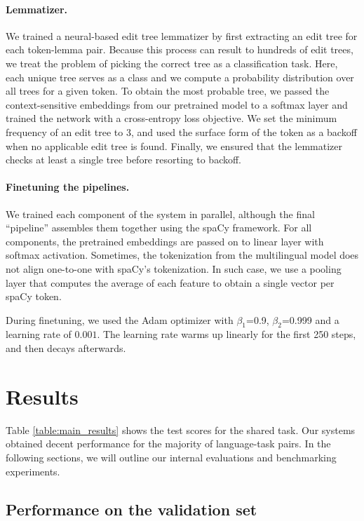 \documentclass[11pt]{article}
\begin{document}
\paragraph{Lemmatizer.}
We trained a neural-based edit tree lemmatizer \cite{muller-etal-2015-joint} by first extracting an edit tree for each token-lemma pair.
Because this process can result to hundreds of edit trees, we treat the problem of picking the correct tree as a classification task.
Here, each unique tree serves as a class and we compute a probability distribution over all trees for a given token.
To obtain the most probable tree, we passed the context-sensitive embeddings from our pretrained model to a softmax layer and trained the network with a cross-entropy loss objective.
We set the minimum frequency of an edit tree to 3, and used the surface form of the token as a backoff when no applicable edit tree is found.
Finally, we ensured that the lemmatizer checks at least a single tree before resorting to backoff.

\paragraph{Finetuning the pipelines.} We trained each component of the system in parallel, although the final ``pipeline'' assembles them together using the spaCy framework.
For all components, the pretrained embeddings are passed on to linear layer with softmax activation.
Sometimes, the tokenization from the multilingual model does not align one-to-one with spaCy's tokenization.
In such case, we use a pooling layer that computes the average of each feature to obtain a single vector per spaCy token.

During finetuning, we used the Adam optimizer with $\beta_1$=0.9, $\beta_2$=0.999 and a learning rate of $0.001$.
The learning rate warms up linearly for the first 250 steps, and then decays afterwards.

\section{Results}

Table \ref{table:main_results} shows the test scores for the shared task.
Our systems obtained decent performance for the majority of language-task pairs.
In the following sections, we will outline our internal evaluations and benchmarking experiments.

\subsection{Performance on the validation set}
\end{document}
